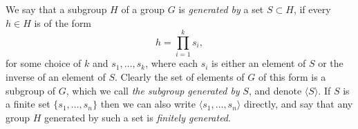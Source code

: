 \begin{define}
	We say that a subgroup $H$ of a group $G$ is \emph{generated by} a set $S \subset H$, if every $h \in H$ is of the form
	\[h = \prod_{i=1}^k s_i,\]
	for some choice of $k$ and $s_1,\dots,s_k$, where each $s_i$ is either an element of $S$ or the inverse of an element of $S$. Clearly the set of elements of $G$ of this form is a subgroup of $G$, which we call \emph{the subgroup generated by} $S$, and denote $\langle S \rangle$. If $S$ is a finite set $\{s_1,\dots,s_n\}$ then we can also write $\langle s_1,\dots,s_n\rangle$ directly, and say that any group $H$ generated by such a set is \emph{finitely generated}.
\end{define}